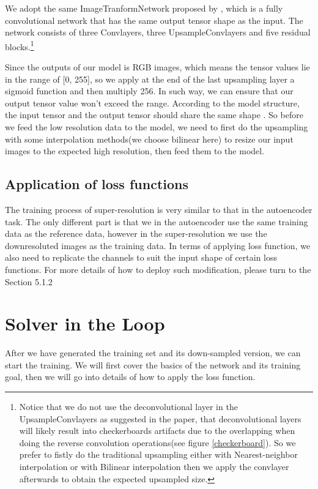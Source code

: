 \documentclass[a4paper,12pt,twoside]{report}
\begin{document}
We adopt the same ImageTranformNetwork proposed by \citeauthor{johnson2016perceptual}, which is a fully convolutional network that has the same output tensor shape as the input. The network consists of three Convlayers, three UpsampleConvlayers and five residual blocks.\footnote{Notice that we do not use the deconvolutional layer in the UpsampleConvlayers as suggested in the paper\cite{odena2016deconvolution}, that deconvolutional layers will likely result into checkerboards artifacts due to the overlapping when doing the reverse convolution operations(see figure \ref{checkerboard}). So we prefer to fistly do the traditional upsampling either with Nearest-neighbor interpolation or with Bilinear interpolation then we apply the convlayer afterwards to obtain the expected upsampled size.}

Since the outputs of our model is RGB images, which means the tensor values lie in the range of [0, 255], so we apply at the end of the last upsampling layer a sigmoid function and then multiply 256. In such way, we can ensure that our output tensor value won't exceed the range. According to the model structure, the input tensor and the output tensor should share the same shape . So before we feed the low resolution data to the model, we need to first do the upsampling with some interpolation methods(we choose bilinear here) to resize our input images to the expected high resolution, then feed them to the model. 

\subsection{Application of loss functions}
The training process of super-resolution is very similar to that in the autoencoder task. The only different part is that we in the autoencoder use the same training data as the reference data, however in the super-resolution we use the downresoluted images as the training data. In terms of applying loss function, we also need to replicate the channels to suit the input shape of certain loss functions. For more details of how to deploy such modification, please turn to the Section 5.1.2


\section{Solver in the Loop}
After we have generated the training set and its down-sampled version, we can start the training. We will first cover the basics of the network and its training goal, then we will go into details of how to apply the loss function.
\end{document}
